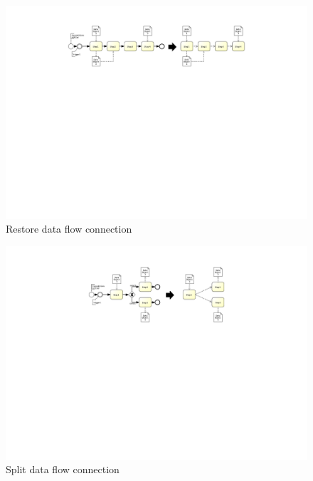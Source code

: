 \begin{figure}[h!]
	\centering
	\includegraphics[width=\textwidth, trim={7.5cm 15cm 7cm 2cm}]{img/ExtractDFDRestore.pdf}
	\caption{Restore data flow connection}
	\label{fig:restoreDataFlow}
\end{figure}


\begin{figure}[h!]
	\includegraphics[width=13cm, trim={8.5cm 13.8cm 8.5cm 2.2cm}]{img/ExtractDFDGateWaySplit.pdf}
	\caption{Split data flow connection}
	\label{fig:splitDataFlow}
\end{figure}

